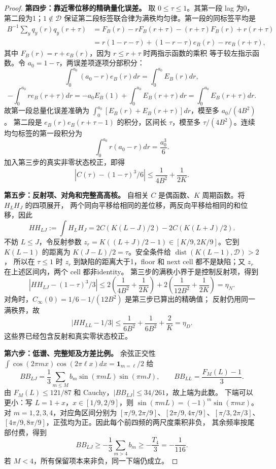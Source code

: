 \begin{proof}
\textbf{第四步：靠近零位移的精确量化误差。}
取 $0\le\tau\le1$。其第一段 lag 为0，第二段为1；$1\notin\mathcal D$
保证第二段标签联合律为满秩均匀律。第一段的同标签平均是
\begin{align*}
 B^{-1}\sum_yq_y(r)q_y(r+\tau)
 &=F_B(r)-rF_B(r+\tau)-(r+\tau)F_B(r)+r(r+\tau)\\
 &=r(1-r-\tau)+(1-r-\tau)e_B(r)-r e_B(r+\tau),
\end{align*}
其中 $F_B(r)=r+e_B(r)$，因为 $r\le r+\tau$ 时两指示函数的乘积
等于较左指示函数。令 $a_0=1-\tau$，两误差项逐项分部积分：
\[
 \int_0^{a_0}(a_0-r)e_B(r)dr=\int_0^{a_0}E_B(r)dr,
\]
\[
 -\int_0^{a_0}r e_B(r+\tau)dr
 =-a_0E_B(1)+\int_0^{a_0}E_B(r+\tau)dr
 =\int_0^{a_0}E_B(r+\tau)dr.
\]
故第一段总量化误差准确为
$\int_0^{a_0}[E_B(r)+E_B(r+\tau)]dr$，模至多 $a_0/(4B^2)$。
第二段是 $e_B(r)e_B(r+\tau-1)$ 的积分，区间长 $\tau$，模至多
$\tau/(4B^2)$。连续均匀标签的第一段积分为
\[
 \int_0^{a_0}r(a_0-r)dr=\frac{a_0^3}{6}.
\]
加入第三步的真实非零状态校正，即得
\[
 |C(\tau)-(1-\tau)^3/6|\le\frac1{4B^2}+\frac1{2K}.
\]

\textbf{第五步：反射项、对角和完整高高核。}
自相关 $C$ 是偶函数、$K$ 周期函数。将 $H_LH_J$ 的四项展开，
两个同向平移给相同的差位移，两反向平移给相同的和位移，因此
\[
 HH_{LJ}:=\int H_LH_J
 =2C(K(L-J)/2)-2C(K(L+J)/2).
\]
不妨 $L\le J$，令反射参数
$z_r=K((L+J)/2-1)\in[K/9,2K/9]$。它到 $K(L-1)$ 的距离为
$K(J-L)/2=\tau$。安全条件给 $\operatorname{dist}(K(L-1),\mathcal D)>2$，
所以在 $\tau\le1$ 时 $z_r$ 到缺陷的距离大于1，floor 和 next cell
都不是缺陷；又 $z_r$ 在上述区间内，两个 cell 都非identity。
第三步的满秩小界于是控制反射项，得到
\[
 |HH_{LJ}-(1-\tau)^3/3|
 \le2\left(\frac1{4B^2}+\frac1{2K}\right)
 +2\left(\frac1{12B^2}+\frac1{2K}\right)=\eta_N.
\]
对角时，$C_\infty(0)=1/6-1/(12B^2)$ 是第三步已算出的精确值；
反射仍用同一满秩界，故
\[
 |HH_{LL}-1/3|
 \le\frac1{6B^2}+\frac1{6B^2}+\frac2K=\eta_D.
\]
这些界已经包含反射和真实零状态校正。

\textbf{第六步：低谱、完整矩及方差比例。}
余弦正交性 $\int\cos(2\pi mx)\cos(2\pi\ell x)dx=
\mathbf1_{m=\ell}/2$ 给
\[
 BB_{LJ}=\frac13\sum_{m\le M}b_m\sin(\pi mL)\sin(\pi mJ),
 \qquad BB_{LL}=\frac{F_M(L)-1}{3}.
\]
由 $F_M(L)\le121/87$ 和 Cauchy，$|BB_{LJ}|\le34/261$，故上端为此数。
下端可以更小：写 $L=1+x$，$x\in[1/9,2/9]$，则
$\sin(\pi mL)=(-1)^m\sin(\pi mx)$。
对 $m=1,2,3,4$，对应角区间分别为
$[\pi/9,2\pi/9]$、$[2\pi/9,4\pi/9]$、$[\pi/3,2\pi/3]$、
$[4\pi/9,8\pi/9]$，正弦均为正。因此每个前四频的两尺度乘积非负，
其余频率按尾部付费，得到
\[
 BB_{LJ}\ge-\frac13\sum_{m>4}b_m\ge-\frac{T_4}{3}=-\frac1{116}.
\]
若 $M<4$，所有保留项本来非负，同一下端仍成立。


\end{proof}
